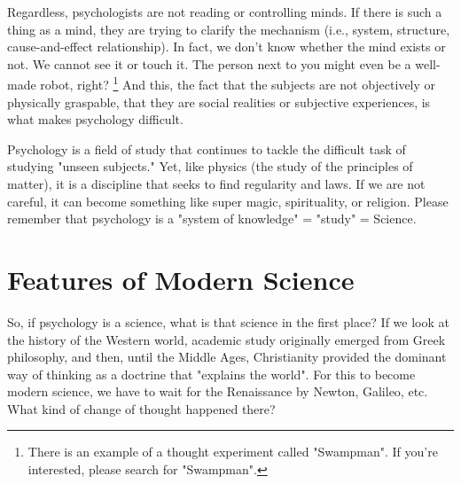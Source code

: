 \documentclass{ltjsbook}
\begin{document}
Regardless, psychologists are not reading or controlling minds. If there is such a thing as a mind, they are trying to clarify the mechanism (i.e., system, structure, cause-and-effect relationship). In fact, we don't know whether the mind exists or not. We cannot see it or touch it. The person next to you might even be a well-made robot, right? \footnote{There is an example of a thought experiment called "Swampman". If you're interested, please search for "Swampman".} And this, the fact that the subjects are not objectively or physically graspable, that they are social realities or subjective experiences, is what makes psychology difficult.

Psychology is a field of study that continues to tackle the difficult task of studying "unseen subjects." Yet, like physics (the study of the principles of matter), it is a discipline that seeks to find regularity and laws. If we are not careful, it can become something like super magic, spirituality, or religion. Please remember that psychology is a "system of knowledge" = "study" = Science.

\section{Features of Modern Science}

So, if psychology is a science, what is that science in the first place? If we look at the history of the Western world, academic study originally emerged from Greek philosophy, and then, until the Middle Ages, Christianity provided the dominant way of thinking as a doctrine that "explains the world". For this to become modern science, we have to wait for the Renaissance by Newton, Galileo, etc. What kind of change of thought happened there?
\end{document}
